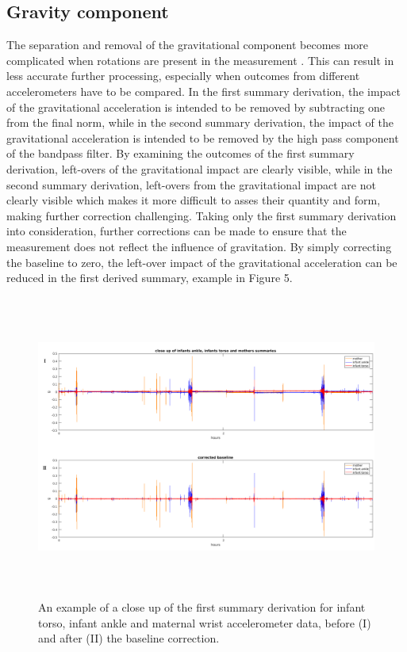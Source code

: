\documentclass{article}
\begin{document}
{\subsection{Gravity component}
The separation and removal of the gravitational component becomes more complicated when rotations are present in the measurement \cite{ref3}. This can result in less accurate further processing, especially when outcomes from different accelerometers have to be compared. In the first summary derivation, the impact of the gravitational acceleration is intended to be removed by subtracting one from the final norm, while in the second summary derivation, the impact of the gravitational acceleration is intended to be removed by the high pass component of the bandpass filter. By examining the outcomes of the first summary derivation, left-overs of the gravitational impact are clearly visible, while in the second summary derivation, left-overs from the gravitational impact are not clearly visible which makes it more difficult to asses their quantity and form, making further correction challenging. Taking only the first summary derivation into consideration, further corrections can be made to ensure that the measurement does not reflect the influence of gravitation. By simply correcting the baseline to zero, the left-over impact of the gravitational acceleration can be reduced in the first derived summary, example in Figure 5. 
\newpage
\begin{figure}[h!]
\includegraphics[width=15cm, height=10cm]{exampleTorsoAnkle5.png}
\caption{An example of a close up of the first summary derivation for infant torso, infant ankle and maternal wrist accelerometer data, before (I) and after (II) the baseline correction.}

\end{figure}}
\end{document}
